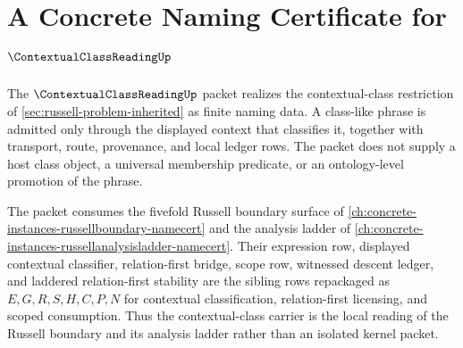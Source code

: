 \chapter{A Concrete Naming Certificate for $\ContextualClassReadingUp$}
\label{ch:concrete-instances-contextualclassreading-namecert}

The $\ContextualClassReadingUp$ packet realizes the contextual-class restriction of \autoref{sec:russell-problem-inherited} as finite naming data. A class-like phrase is admitted only through the displayed context that classifies it, together with transport, route, provenance, and local ledger rows. The packet does not supply a host class object, a universal membership predicate, or an ontology-level promotion of the phrase.

The packet consumes the fivefold Russell boundary surface of \autoref{ch:concrete-instances-russellboundary-namecert} and the analysis ladder of \autoref{ch:concrete-instances-russellanalysisladder-namecert}. Their expression row, displayed contextual classifier, relation-first bridge, scope row, witnessed descent ledger, and laddered relation-first stability are the sibling rows repackaged as $E,G,R,S,H,C,P,N$ for contextual classification, relation-first licensing, and scoped consumption. Thus the contextual-class carrier is the local reading of the Russell boundary and its analysis ladder rather than an isolated kernel packet.

